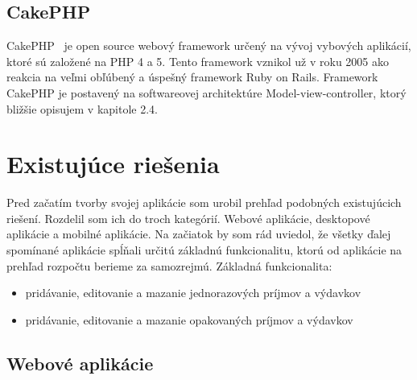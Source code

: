 \documentclass[12pt]{book}
\begin{document}
\subsection{CakePHP} 
CakePHP \cite{CakePHP}\ je open source webový framework určený na vývoj vybových aplikácií, ktoré sú založené na PHP 4 a 5. Tento framework vznikol už v roku 2005 ako reakcia na veľmi obľúbený a úspešný framework Ruby on Rails. Framework CakePHP je postavený na softwareovej architektúre Model-view-controller, ktorý bližšie opisujem v kapitole 2.4.
 


\section{Existujúce riešenia}
Pred začatím tvorby svojej aplikácie som urobil prehľad podobných existujúcich riešení. Rozdelil som ich do troch kategórií. Webové aplikácie, desktopové aplikácie a mobilné aplikácie.
Na začiatok by som rád uviedol, že všetky ďalej spomínané aplikácie spĺňali určitú základnú funkcionalitu, ktorú od aplikácie na prehľad rozpočtu berieme za samozrejmú.
Základná funkcionalita:
\begin{itemize}
\item{pridávanie, editovanie a mazanie jednorazových príjmov a výdavkov}
\item{pridávanie, editovanie a mazanie opakovaných príjmov a výdavkov}
\end{itemize}

\subsection{Webové aplikácie}
\end{document}

